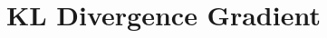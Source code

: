 \documentclass[12pt]{article}
\begin{document}
\section{KL Divergence Gradient}
    


\printbibliography
\end{document}
